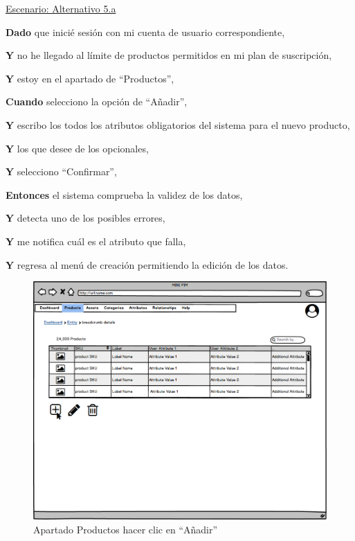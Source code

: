 \underline{Escenario: Alternativo 5.a}\par
\vspace{0.15cm}
\textbf{Dado} que inicié sesión con mi cuenta de usuario correspondiente,\par
\textbf{Y} no he llegado al límite de productos permitidos en mi plan de suscripción,\par
\textbf{Y} estoy en el apartado de \enquote{Productos},\par
\textbf{Cuando} selecciono la opción de \enquote{Añadir},\par
\textbf{Y} escribo los todos los atributos obligatorios del sistema para el nuevo producto,\par
\textbf{Y} los que desee de los opcionales,\par
\textbf{Y} selecciono \enquote{Confirmar},\par
\textbf{Entonces} el sistema comprueba la validez de los datos,\par
\textbf{Y} detecta uno de los posibles errores,\par
\textbf{Y} me notifica cuál es el atributo que falla,\par
\textbf{Y} regresa al menú de creación permitiendo la edición de los datos.\par
\vspace{0.20cm}

\begin{figure}[H]
    \includegraphics[width=1\linewidth]{mockups/RF2.1_boceto1.png}
    \caption{Apartado Productos hacer clic en \enquote{Añadir}}
   \end{figure}
\vspace{1.0cm}

